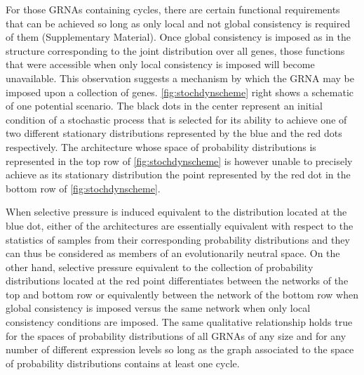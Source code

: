 For those GRNAs containing cycles, there are certain functional requirements that can be achieved so long as only local and not global consistency is required of them (Supplementary Material). Once global consistency is imposed as in the structure corresponding to the joint distribution over all genes, those functions that were accessible when only local consistency is imposed will become unavailable. This observation suggests a mechanism by which the GRNA may be imposed upon a collection of genes. \ref{fig:stochdynscheme} right shows a schematic of one potential scenario. The black dots in the center represent an initial condition of a stochastic process that is selected for its ability to achieve one of two different stationary distributions represented by the blue and the red dots respectively. The architecture whose space of probability distributions is represented in the top row of \ref{fig:stochdynscheme} is however unable to precisely achieve as its stationary distribution the point represented by the red dot in the bottom row of \ref{fig:stochdynscheme}.

When selective pressure is induced equivalent to the distribution located at the blue dot, either of the architectures are essentially equivalent with respect to the statistics of samples from their corresponding probability distributions and they can thus be considered as members of an evolutionarily neutral space. On the other hand, selective pressure equivalent to the collection of probability distributions located at the red point differentiates between the networks of the top and bottom row or equivalently between the network of the bottom row when global consistency is imposed versus the same network when only local consistency conditions are imposed. The same qualitative relationship holds true for the spaces of probability distributions of all GRNAs of any size and for any number of different expression levels so long as the graph associated to the space of probability distributions contains at least one cycle.
